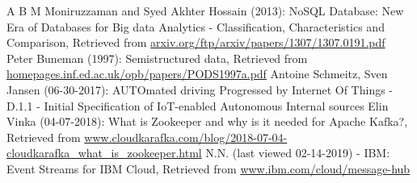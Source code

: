 \begin{thebibliography}{..........}
   	A B M Moniruzzaman and Syed Akhter Hossain (2013):
                              	NoSQL Database: New Era of Databases for Big data Analytics - Classification, Characteristics and Comparison, 
                              	Retrieved from \url{arxiv.org/ftp/arxiv/papers/1307/1307.0191.pdf}
   	Peter Buneman (1997):
                              	Semistructured data,
                              	Retrieved from \url{homepages.inf.ed.ac.uk/opb/papers/PODS1997a.pdf}
   	Antoine Schmeitz, Sven Jansen (06-30-2017):
                           	AUTOmated driving Progressed by Internet Of Things - D.1.1 - Initial Specification of IoT-enabled Autonomous 
                           	Internal sources   			
   	Elin Vinka (04-07-2018):
                              	What is Zookeeper and why is it needed for Apache Kafka?,
                              	Retrieved from \url{www.cloudkarafka.com/blog/2018-07-04-cloudkarafka_what_is_zookeeper.html}
   	N.N. (last viewed 02-14-2019) - IBM:
                              	Event Streams for IBM Cloud, 
                              	Retrieved from \url{www.ibm.com/cloud/message-hub}	


\end{thebibliography}